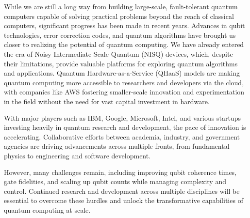 \documentclass{elbioimp2}
\begin{document}
While we are still a long way from building large-scale, fault-tolerant quantum computers capable of solving practical problems beyond the reach of classical computers, significant progress has been made in recent years. Advances in qubit technologies, error correction codes, and quantum algorithms have brought us closer to realizing the potential of quantum computing. We have already entered the era of Noisy Intermediate Scale Quantum (NISQ) devices, which, despite their limitations, provide valuable platforms for exploring quantum algorithms and applications. Quantum Hardware-as-a-Service (QHaaS) models are making quantum computing more accessible to researchers and developers via the cloud, with companies like AWS fostering smaller-scale innovation and experimentation in the field without the need for vast capital investment in hardware.

With major players such as IBM, Google, Microsoft, Intel, and various startups investing heavily in quantum research and development, the pace of innovation is accelerating. Collaborative efforts between academia, industry, and government agencies are driving advancements across multiple fronts, from fundamental physics to engineering and software development.

However, many challenges remain, including improving qubit coherence times, gate fidelities, and scaling up qubit counts while managing complexity and control. Continued research and development across multiple disciplines will be essential to overcome these hurdles and unlock the transformative capabilities of quantum computing at scale.

\newpage

\nocite{*}

\printbibliography[heading=bibintoc,title={References}]
\end{document}
